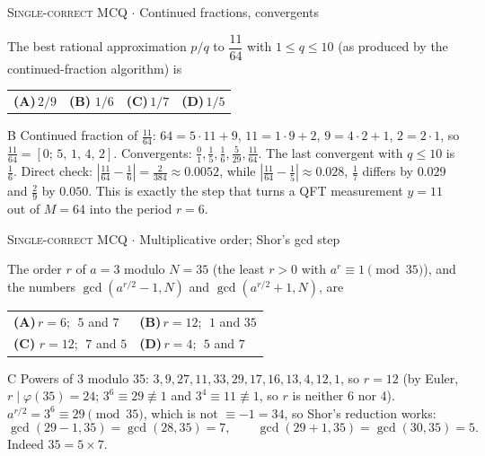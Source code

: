 \documentclass[11pt,a4paper]{article}
\newcommand{\optlabel}[1]{\textbf{(#1)}}
\newcommand{\correctlabel}[1]{\textcolor{okgreen}{\textbf{(#1)}\,\ding{51}}}
\newenvironment{qitem}[1]{\begin{list}{}{\setlength{\leftmargin}{3.3em}\setlength{\labelwidth}{3.1em}%
  \setlength{\labelsep}{0.2em}\setlength{\topsep}{3pt}\setlength{\parsep}{3pt}}\item[\textbf{Q.#1}\hfill]}{\end{list}}
\newcommand{\qsep}{\par\vspace{2pt}{\color{black!15}\hrule}\vspace{4pt}}
\newcommand{\qmeta}[2]{{\footnotesize\color{black!60}\textsc{#1} \;$\cdot$\; #2}\par}
\begin{document}
\begin{qitem}{7}
\qmeta{Single-correct MCQ}{Continued fractions, convergents}
The best rational approximation $p/q$ to $\dfrac{11}{64}$ with $1 \le q \le 10$ (as produced by the continued-fraction
algorithm) is
\par\smallskip\noindent\begin{tabularx}{\linewidth}{@{}*{4}{L}@{}}
\optlabel{A}\,$2/9$ & \correctlabel{B}\,$1/6$ & \optlabel{C}\,$1/7$ & \optlabel{D}\,$1/5$
\end{tabularx}
\end{qitem}
\begin{solbox}{B}
Continued fraction of $\frac{11}{64}$: $64 = 5\cdot 11 + 9$, $11 = 1\cdot 9 + 2$, $9 = 4\cdot 2 + 1$, $2 = 2\cdot 1$, so
$\frac{11}{64} = [0;\,5,\,1,\,4,\,2]$. Convergents: $\frac{0}{1}, \frac15, \frac16, \frac{5}{29}, \frac{11}{64}$.
The last convergent with $q \le 10$ is $\frac16$. Direct check: $\left|\frac{11}{64} - \frac16\right| = \frac{2}{384} \approx 0.0052$,
while $\left|\frac{11}{64} - \frac15\right| \approx 0.028$, $\frac17$ differs by $0.029$ and $\frac29$ by $0.050$.
This is exactly the step that turns a QFT measurement $y = 11$ out of $M = 64$ into the period $r = 6$.
\end{solbox}
\qsep

\begin{qitem}{8}
\qmeta{Single-correct MCQ}{Multiplicative order; Shor's gcd step}
The order $r$ of $a = 3$ modulo $N = 35$ (the least $r > 0$ with $a^r \equiv 1 \pmod{35}$), and the numbers
$\gcd(a^{r/2} - 1, N)$ and $\gcd(a^{r/2} + 1, N)$, are
\par\smallskip\noindent\begin{tabularx}{\linewidth}{@{}*{2}{L}@{}}
\optlabel{A}\,$r = 6$; $\;5$ and $7$ & \optlabel{B}\,$r = 12$; $\;1$ and $35$ \\[3pt]
\correctlabel{C}\,$r = 12$; $\;7$ and $5$ & \optlabel{D}\,$r = 4$; $\;5$ and $7$
\end{tabularx}
\end{qitem}
\begin{solbox}{C}
Powers of 3 modulo 35: $3, 9, 27, 11, 33, 29, 17, 16, 13, 4, 12, 1$, so $r = 12$ (by Euler, $r \mid \varphi(35) = 24$;
$3^{6} \equiv 29 \not\equiv 1$ and $3^{4} \equiv 11 \not\equiv 1$, so $r$ is neither 6 nor 4).
$a^{r/2} = 3^6 \equiv 29 \pmod{35}$, which is not $\equiv -1 = 34$, so Shor's reduction works:
\[ \gcd(29 - 1, 35) = \gcd(28, 35) = 7, \qquad \gcd(29 + 1, 35) = \gcd(30, 35) = 5 . \]
Indeed $35 = 5 \times 7$.
\end{solbox}
\qsep
\end{document}
